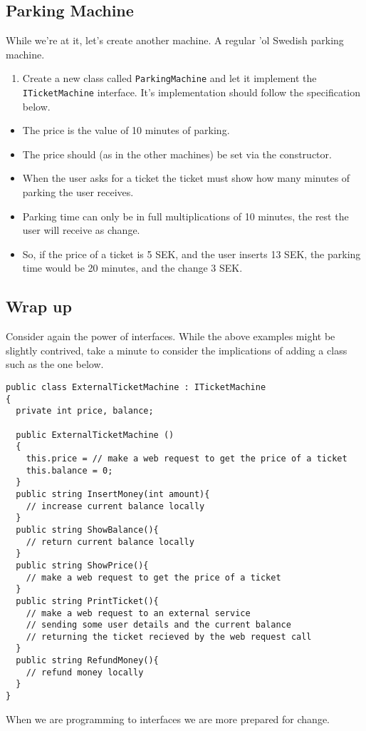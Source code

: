 \documentclass{article}
\newcounter{stepcounter}
\newenvironment{steps}{ 
  \begin{enumerate}[label=\color{red}Step \theenumi)]
    \setcounter{enumi}{\value{stepcounter}}
}{
  \setcounter{stepcounter}{\value{enumi}}
  \end{enumerate}
}
\begin{document}
\subsection{Parking Machine}
While we're at it, let's create another machine. A regular 'ol Swedish parking machine.

\begin{steps}
\item Create a new class called \texttt{ParkingMachine} and let it implement the \texttt{ITicketMachine} interface. It's implementation should follow the specification below.
\end{steps}
\begin{itemize}
  \item The price is the value of 10 minutes of parking.
  \item The price should (as in the other machines) be set via the constructor.
  \item When the user asks for a ticket the ticket must show how many minutes of parking the user receives.
  \item Parking time can only be in full multiplications of 10 minutes, the rest the user will receive as change.
  \item So, if the price of a ticket is 5 SEK, and the user inserts 13 SEK, the parking time would be 20 minutes, and the change 3 SEK.
\end{itemize}



\subsection{Wrap up}
Consider again the power of interfaces. While the above examples might be slightly contrived, take a minute to consider the implications of adding a class such as the one below.
\begin{lstlisting}
public class ExternalTicketMachine : ITicketMachine
{ 
  private int price, balance;

  public ExternalTicketMachine ()
  {
    this.price = // make a web request to get the price of a ticket
    this.balance = 0;
  }
  public string InsertMoney(int amount){
    // increase current balance locally
  }
  public string ShowBalance(){
    // return current balance locally
  }
  public string ShowPrice(){
    // make a web request to get the price of a ticket
  }
  public string PrintTicket(){
    // make a web request to an external service
    // sending some user details and the current balance
    // returning the ticket recieved by the web request call
  }
  public string RefundMoney(){
    // refund money locally
  }
}
\end{lstlisting}
When we are programming to interfaces we are more prepared for change.
\end{document}
